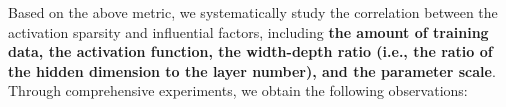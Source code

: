 \documentclass{article} %
\begin{document}

Based on the above metric, we systematically study the correlation between the activation sparsity and influential factors, including \textbf{the amount of training data, the activation function, the width-depth ratio (i.e., the ratio of the hidden dimension to the layer number), and the parameter scale}. Through comprehensive experiments, we obtain the following observations:
\end{document}
